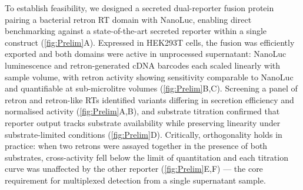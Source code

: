 To establish feasibility, we designed a secreted dual-reporter fusion protein
pairing a bacterial retron RT domain with NanoLuc, enabling direct benchmarking
against a state-of-the-art secreted reporter within a single construct
\cite{hall2012} (\cref{fig:Prelim}A). Expressed in HEK293T cells, the fusion was
efficiently exported and both domains were active in unprocessed supernatant:
NanoLuc luminescence and retron-generated cDNA barcodes each scaled linearly
with sample volume, with retron activity showing sensitivity comparable to
NanoLuc and quantifiable at sub-microlitre volumes (\cref{fig:Prelim}B,C).
Screening a panel of retron and retron-like RTs identified variants differing in
secretion efficiency and normalised activity (\cref{fig:Prelim}A,B), and
substrate titration confirmed that reporter output tracks substrate availability
while preserving linearity under substrate-limited conditions
(\cref{fig:Prelim}D). Critically, orthogonality holds in practice: when two
retrons were assayed together in the presence of both substrates, cross-activity
fell below the limit of quantitation and each titration curve was unaffected by
the other reporter (\cref{fig:Prelim}E,F) --- the core requirement for
multiplexed detection from a single supernatant sample.



